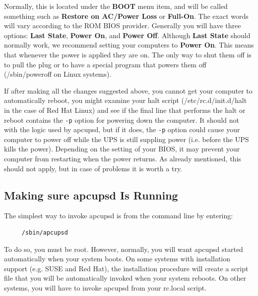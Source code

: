 Normally, this is located under the {\bf BOOT} menu item, and will be called
something such as {\bf Restore on AC/Power Loss} or {\bf Full-On}. The exact
words will vary according to the ROM BIOS provider. Generally you will have
three options: {\bf Last State}, {\bf Power On}, and {\bf Power Off}. Although
{\bf Last State} should normally work, we recommend setting your computers to
{\bf Power On}. This means that whenever the power is applied they are on. The
only way to shut them off is to pull the plug or to have a special program
that powers them off (/sbin/poweroff on Linux systems).  

If after making all the changes suggested above, you cannot get your computer
to automatically reboot, you might examine your halt script
(/etc/rc.d/init.d/halt in the case of Red Hat Linux) and see if the final line
that performs the halt or reboot contains the {\tt -p} option for powering
down the computer. It should not with the logic used by apcupsd, but if it
does, the {\tt -p} option could cause your computer to power off while the UPS
is still suppling power (i.e. before the UPS kills the power).  Depending on
the setting of your BIOS, it may prevent your computer from restarting when
the power returns. As already mentioned, this should not apply, but in case of
problems it is worth a try. 

\label{Making-sure-apcupsd-Is-Running}

\subsection*{Making sure apcupsd Is Running}

\label{index-Checking-running-62}
The simplest way to invoke apcupsd is from the command line by entering: 

\footnotesize
\begin{verbatim}
     /sbin/apcupsd
\end{verbatim}
\normalsize

To do so, you must be root. However, normally, you will want apcupsd started
automatically when your system boots. On some systems with installation
support (e.g. SUSE and Red Hat), the installation procedure will create a
script file that you will be automatically invoked when your system reboots.
On other systems, you will have to invoke apcupsd from your rc.local script.  

